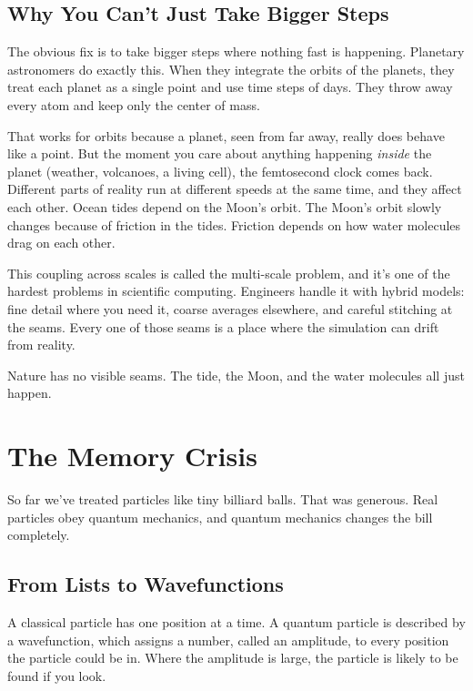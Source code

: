 \subsection{Why You Can't Just Take Bigger Steps}

The obvious fix is to take bigger steps where nothing fast is happening. Planetary astronomers do exactly this. When they integrate the orbits of the planets, they treat each planet as a single point and use time steps of days. They throw away every atom and keep only the center of mass.

That works for orbits because a planet, seen from far away, really does behave like a point. But the moment you care about anything happening \emph{inside} the planet (weather, volcanoes, a living cell), the femtosecond clock comes back. Different parts of reality run at different speeds at the same time, and they affect each other. Ocean tides depend on the Moon's orbit. The Moon's orbit slowly changes because of friction in the tides. Friction depends on how water molecules drag on each other.

This coupling across scales is called the multi-scale problem, and it's one of the hardest problems in scientific computing. Engineers handle it with hybrid models: fine detail where you need it, coarse averages elsewhere, and careful stitching at the seams. Every one of those seams is a place where the simulation can drift from reality.

Nature has no visible seams. The tide, the Moon, and the water molecules all just happen.

\section{The Memory Crisis}

So far we've treated particles like tiny billiard balls. That was generous. Real particles obey quantum mechanics, and quantum mechanics changes the bill completely.

\subsection{From Lists to Wavefunctions}

A classical particle has one position at a time. A quantum particle is described by a wavefunction, which assigns a number, called an amplitude, to every position the particle could be in. Where the amplitude is large, the particle is likely to be found if you look.

